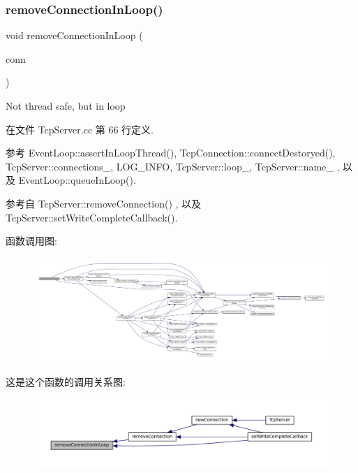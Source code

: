 \subsubsection{\texorpdfstring{remove\+Connection\+In\+Loop()}{removeConnectionInLoop()}}
{\footnotesize\ttfamily void remove\+Connection\+In\+Loop (\begin{DoxyParamCaption}\item[{const \hyperlink{namespacemuduo_a40c45128e9700d337d92f3cbb8dd4a0a}{Tcp\+Connection\+Ptr} \&}]{conn }\end{DoxyParamCaption})\hspace{0.3cm}{\ttfamily [private]}}



Not thread safe, but in loop 



在文件 Tcp\+Server.\+cc 第 66 行定义.



参考 Event\+Loop\+::assert\+In\+Loop\+Thread(), Tcp\+Connection\+::connect\+Destoryed(), Tcp\+Server\+::connections\+\_\+, L\+O\+G\+\_\+\+I\+N\+FO, Tcp\+Server\+::loop\+\_\+, Tcp\+Server\+::name\+\_\+ , 以及 Event\+Loop\+::queue\+In\+Loop().



参考自 Tcp\+Server\+::remove\+Connection() , 以及 Tcp\+Server\+::set\+Write\+Complete\+Callback().

函数调用图\+:
\nopagebreak
\begin{figure}[H]
\begin{center}
\leavevmode
\includegraphics[width=350pt]{classmuduo_1_1TcpServer_a38345725075c2bf845af025c2567d977_cgraph}
\end{center}
\end{figure}
这是这个函数的调用关系图\+:
\nopagebreak
\begin{figure}[H]
\begin{center}
\leavevmode
\includegraphics[width=350pt]{classmuduo_1_1TcpServer_a38345725075c2bf845af025c2567d977_icgraph}
\end{center}
\end{figure}
\mbox{\label{classmuduo_1_1TcpServer_abbb0008856a8495adb08c8cb7fe65c2c}} 
